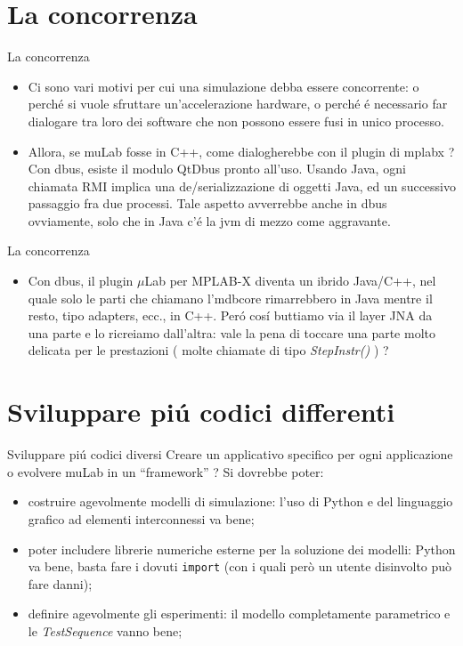 \documentclass{beamer}
\begin{document}
\section{La concorrenza}
\begin{frame}{La concorrenza}
\begin{itemize}
\item Ci sono vari motivi per cui una simulazione debba essere concorrente: o perch\'e si vuole sfruttare un'accelerazione hardware, o
perch\'e \'e necessario far dialogare tra loro dei software che non possono essere fusi in unico processo.
\item Allora, se muLab fosse in C++, come dialogherebbe con il plugin di mplabx ? Con dbus, esiste il modulo QtDbus pronto all'uso.
Usando Java, ogni chiamata RMI implica una de/serializzazione di oggetti Java, ed un successivo passaggio fra due processi. Tale aspetto
avverrebbe anche in dbus ovviamente, solo che in Java c'\'e la jvm di mezzo come aggravante.
\end{itemize}
\end{frame}





\begin{frame}{La concorrenza}
\begin{itemize}
\item Con dbus, il plugin $\mu$Lab per MPLAB-X diventa un ibrido Java/C++, nel quale solo le parti che chiamano l'mdbcore rimarrebbero in
Java mentre il resto, tipo adapters, ecc., in C++. Per\'o cos\'i buttiamo via il layer JNA da una parte e lo ricreiamo dall'altra: vale
la pena di toccare una parte molto delicata per le prestazioni ( molte chiamate di tipo \textit{StepInstr()} ) ?
\end{itemize}
\end{frame}


\section{Sviluppare pi\'u codici differenti}
\begin{frame}{Sviluppare pi\'u codici diversi}
Creare un applicativo specifico per ogni applicazione o evolvere muLab in un ``framework'' ? 
Si dovrebbe poter:
\begin{itemize}
\item costruire agevolmente modelli di simulazione: l'uso di Python e del linguaggio grafico ad elementi interconnessi va bene;
\item poter includere librerie numeriche esterne per la soluzione dei modelli: Python va bene, basta fare i dovuti \texttt{import} (con i
quali però un utente disinvolto può fare danni);
\item definire agevolmente gli esperimenti: il modello completamente parametrico e le \textit{TestSequence} vanno bene;
\end{itemize}
\end{frame}
\end{document}
